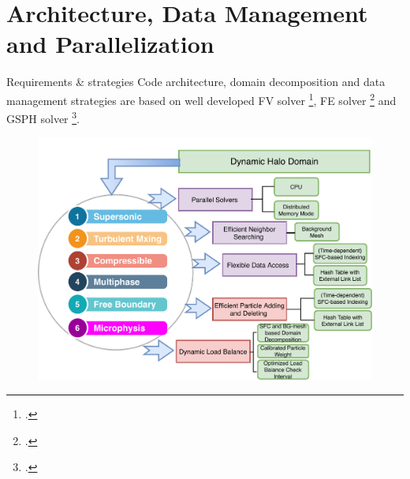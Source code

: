 \documentclass{beamer}
\begin{document}
\section{Architecture, Data Management and Parallelization}
\begin{frame}{Requirements \& strategies}
Code architecture, domain decomposition and data management strategies are based on well developed FV solver \footcite{pitman2003computing}, FE solver \footcite{patra2003data} and GSPH solver \footcite{kumar2013parallel}. 
\begin{figure}[!t]
\centering
\includegraphics[width=0.60 \textwidth]{./PPT/Requirement_all}
\label{fig:Requirements}
\end{figure}
\end{frame}
\end{document}
